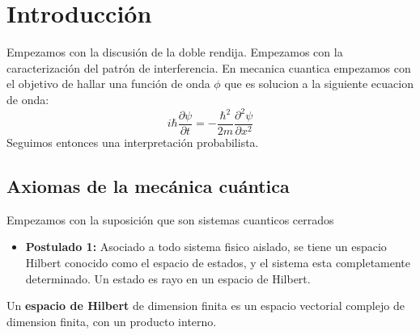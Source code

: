 \section{Introducción}
Empezamos con la discusión  de la doble rendija. Empezamos con la caracterización del patrón de interferencia.
En mecanica cuantica empezamos con el objetivo de hallar una función de onda $ \phi $ que es solucion a la siguiente ecuacion de onda:
\[ i \hbar \frac{\partial \psi}{\partial t}  = - \frac{\hbar^2}{2m} \frac{\partial^2 \psi}{\partial x^2}\]
Seguimos entonces una interpretación probabilista.
\subsection{Axiomas de la mecánica cuántica}
Empezamos con la suposición que son sistemas cuanticos cerrados
\begin{itemize}
	\item \textbf{Postulado 1:} Asociado a todo sistema fisico aislado, se tiene un espacio Hilbert conocido como el espacio de estados, y el sistema esta completamente determinado. Un estado es rayo en un espacio de Hilbert.
	
\end{itemize}

\begin{define}
	Un \textbf{espacio de Hilbert} de dimension finita es un espacio vectorial complejo de dimension finita, con un producto interno.
\end{define}